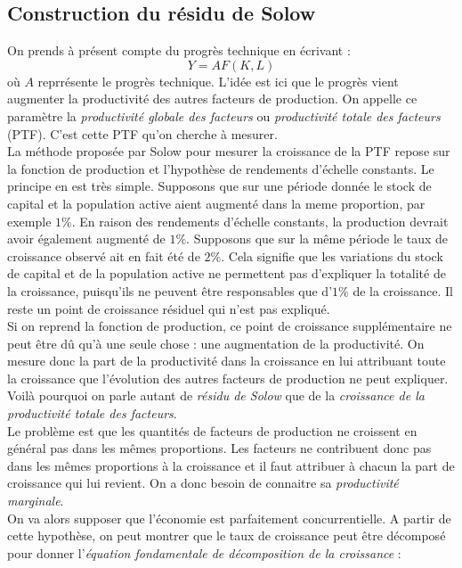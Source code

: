 \documentclass[10pt]{book}
\begin{document}
\subsection{Construction du résidu de Solow}
On prends à présent compte du progrès technique en écrivant :
$$ Y = A F(K,L) $$
où $A$ reprrésente le progrès technique. L'idée est ici que le progrès vient augmenter la productivité des autres facteurs de production. On appelle ce paramètre la \textit{productivité globale des facteurs} ou \textit{productivité totale des facteurs} (PTF). C'est cette PTF qu'on cherche à mesurer. \\
La méthode proposée par Solow pour mesurer la croissance de la PTF repose sur la fonction de production et l'hypothèse de rendements d'échelle constants. Le principe en est très simple. Supposons que sur une période donnée le stock de capital et la population active aient augmenté dans la meme proportion, par exemple $1\%$. En raison des rendements d'échelle constants, la production devrait avoir également augmenté de $1\%$. Supposons que sur la même période le taux de croissance observé ait en fait été de $2\%$. Cela signifie que les variations du stock de capital et de la population active ne permettent pas d'expliquer la totalité de la croissance, puisqu'ils ne peuvent être responsables que d'$1\%$ de la croissance. Il reste un point de croissance résiduel qui n'est pas expliqué. \\
Si on reprend la fonction de production, ce point de croissance supplémentaire ne peut être dû qu'à une seule chose : une augmentation de la productivité. On mesure donc la part de la productivité dans la croissance en lui attribuant toute la croissance que l'évolution des autres facteurs de production ne peut expliquer. Voilà pourquoi on parle autant de \textit{résidu de Solow} que de la \textit{croissance de la productivité totale des facteurs}. \\
Le problème est que les quantités de facteurs de production ne croissent en général pas dans les mêmes proportions. Les facteurs ne contribuent donc pas dans les mêmes proportions à la croissance et il faut attribuer à chacun la part de croissance qui lui revient. On a donc besoin de connaitre sa \textit{productivité marginale}. \\
On va alors supposer que l'économie est parfaitement concurrentielle. A partir de cette hypothèse, on peut montrer que le taux de croissance peut être décomposé pour donner l'\textit{équation fondamentale de décomposition de la croissance} : 
\begin{center}
\end{center}
\end{document}
